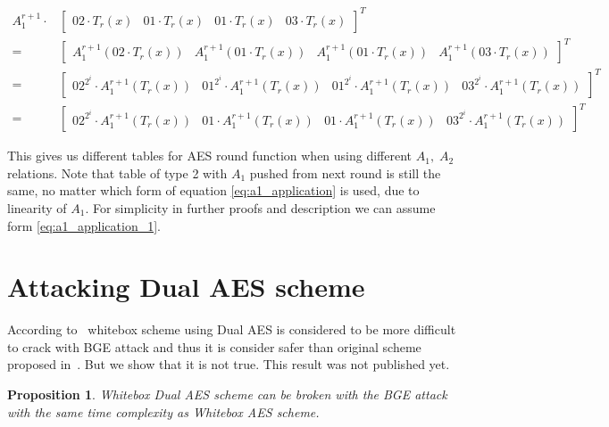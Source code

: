 \documentclass[11pt,oneside,final]{fithesis2}
\newtheorem{myprop}{Proposition}
\begin{document}
	{%
	\begin{subequations}\label{eq:a1_application}
	\begin{align}
	       A_1^{r+1} \cdot &\begin{bmatrix}           02 \cdot T_r(x)        &           01 \cdot T_r(x)        &           01 \cdot T_r(x)        &           03 \cdot T_r(x)        \end{bmatrix}^T \label{eq:a1_application_1} \\
	    =                  &\begin{bmatrix} A_1^{r+1}(02 \cdot T_r(x))       & A_1^{r+1}(01 \cdot T_r(x))       & A_1^{r+1}(01 \cdot T_r(x))       & A_1^{r+1}(03 \cdot T_r(x))       \end{bmatrix}^T \nonumber\\
	    =                  &\begin{bmatrix} 02^{2^i} \cdot A_1^{r+1}(T_r(x)) & 01^{2^i} \cdot A_1^{r+1}(T_r(x)) & 01^{2^i} \cdot A_1^{r+1}(T_r(x)) & 03^{2^i} \cdot A_1^{r+1}(T_r(x)) \end{bmatrix}^T \nonumber\\
	    =                  &\begin{bmatrix} 02^{2^i} \cdot A_1^{r+1}(T_r(x)) & 01 \cdot A_1^{r+1}(T_r(x))       & 01 \cdot A_1^{r+1}(T_r(x))       & 03^{2^i} \cdot A_1^{r+1}(T_r(x)) \end{bmatrix}^T
	\end{align}
	\end{subequations}}
	
	This gives us different tables for AES round function when using different $A_1,\;A_2$ relations. Note that table of type 2 with $A_1$ pushed from next round 
	is still the same, no matter which form of equation \ref{eq:a1_application} is used, due to linearity of $A_1$. 
	For simplicity in further proofs and description we can assume form \ref{eq:a1_application_1}.

    \section{Attacking Dual AES scheme}\label{sec:attacking_dual_aes}
	According to~\citep{Karroumi:2010:PWA:2041036.2041060} whitebox scheme using Dual AES is considered to be more difficult to crack with BGE attack and thus it is consider
	safer than original scheme proposed in~\citep{Chow02white-boxcryptography}. But we show that it is not true. This result was not published yet.
	
	\begin{myprop}
	Whitebox Dual AES scheme can be broken with the BGE attack with the same time complexity as Whitebox AES scheme.
	\end{myprop}
\end{document}

